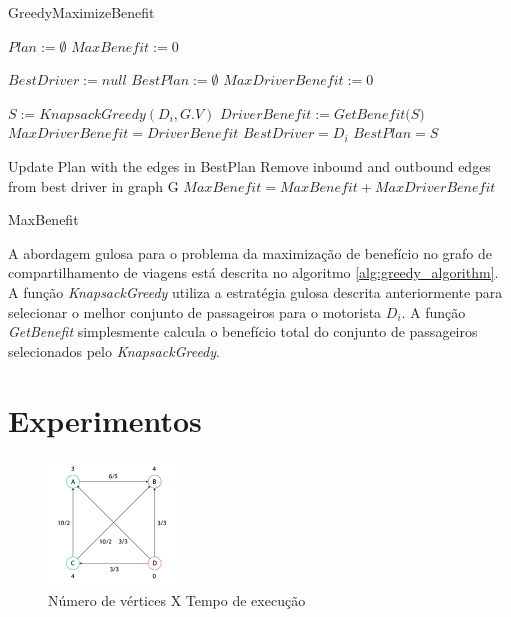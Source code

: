 \documentclass{article}
\begin{document}
\begin{algorithm}
\caption{GreedyMaximizeBenefit}
\begin{algorithmic}[1]

\State $ Plan := \emptyset $
\State $ MaxBenefit := 0 $
\item {}
  \State $ BestDriver := null $
  \State $ BestPlan := \emptyset $
  \State $ MaxDriverBenefit := 0 $
  \item {}
    \State $ S := KnapsackGreedy(D_i, G.V) $
    \State $ DriverBenefit := \textit{GetBenefit(S)} $
      \State $ MaxDriverBenefit = DriverBenefit $
      \State $ BestDriver = D_i $
      \State $ BestPlan = S $
    \EndIf
  \EndFor

  \State Update Plan with the edges in BestPlan
  \State Remove inbound and outbound edges from best driver in graph G
  \State $ MaxBenefit = MaxBenefit + MaxDriverBenefit $
\EndWhile

\Return MaxBenefit

\EndProcedure
\end{algorithmic}
\label{alg:greedy_algorithm}
\end{algorithm}

A abordagem gulosa para o problema da maximização de benefício no grafo de compartilhamento de viagens está
descrita no algoritmo \ref{alg:greedy_algorithm}. A função \textit{KnapsackGreedy} utiliza a estratégia gulosa descrita anteriormente
para selecionar o melhor conjunto de passageiros para o motorista $ D_i $. A função \textit{GetBenefit} simplesmente
calcula o benefício total do conjunto de passageiros selecionados pelo \textit{KnapsackGreedy}.

\section{Experimentos}

\begin{figure}
  \center
  \includegraphics[width=128px]{graph.png}
  \caption{Número de vértices X Tempo de execução}
  \label{fig:execution_time}
\end{figure}
\end{document}
